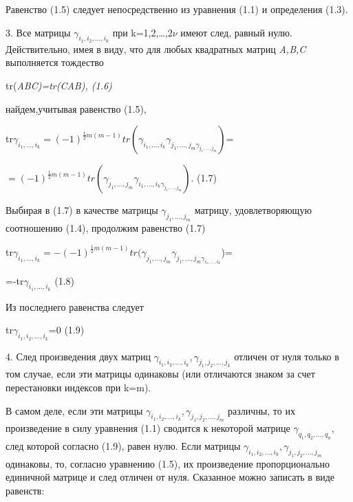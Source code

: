 \documentclass{article}
\begin{document}
{Равенство (1.5) следует непосредственно из уравнения (1.1) и определения (1.3).\par
3. Все матрицы $\gamma_{i_1,i_2,\dots, i_k}$ при k=1,2,\dots,$2\nu$ имеют след, равный нулю. Действительно, имея в виду, что для любых квадратных матриц \textsl{A,B,C} выполняется тождество\par
\begin{center}
tr(\itshape{ABC}\upshape)=tr(\itshape{CAB}\upshape),   (1.6)\par
\end{center}
найдем,учитывая равенство (1.5),\par
tr$\gamma_{i_1,\dots, i_k}=(-1)^{{\frac{1}{2}}m(m-1)}tr(\gamma_{i_1,\dots, i_k}\gamma_{j_1,\dots, j_m\gamma_{j_1,\dots, j_m}})$=\par
\begin{center}
$=(-1)^{{\frac{1}{2}}m(m-1)}tr(\gamma_{j_1,\dots, j_m}\gamma_{i_1,\dots, i_k\gamma_{j_1,\dots, j_m}})$.   (1.7)\par
\end{center}
Выбирая в (1.7) в качестве матрицы $\gamma_{j_1,\dots, j_m}$ матрицу, удовлетворяющую соотношению (1.4), продолжим равенство (1.7)\par
tr$\gamma_{i_1,\dots, i_k}=-(-1)^{{\frac{1}{2}}m(m-1)}tr(\gamma_{j_1,\dots,j_m}\gamma_{j_1,\dots, j_m\gamma_{i_1,\dots, i_k}}$)=\par
\begin{center}
=-tr$\gamma_{i_1,\dots, i_k}$   (1.8)\par
\end{center}
Из последнего равенства следует
\begin{center}
tr$\gamma_{i_1,i_2,\dots, i_k}$=0     (1.9)\par
\end{center}
4. След произведения двух матриц $\gamma_{i_1,i_2,\dots, i_k},\gamma_{j_1,j_2,\dots,j_k}$ отличен от нуля только в том случае, если эти матрицы одинаковы (или отличаются знаком за счет перестановки индексов при k=m).\par
В самом деле, если эти матрицы $\gamma_{i_1,i_2,\dots, i_k},\gamma_{j_1,j_2,\dots,j_m}$ различны, то их произведение в силу уравнения (1.1) сводится к некоторой матрице $\gamma_{q_1,q_2,\dots,q_n}$, след которой согласно (1.9), равен нулю. Если матрицы $\gamma_{i_1,i_2,\dots, i_k},\gamma_{j_1,j_2,\dots,j_m}$ одинаковы, то, согласно уравнению (1.5), их произведение пропорционально единичной матрице и след отличен от нуля. Сказанное можно записать в виде равенств:\par
}
\end{document}
